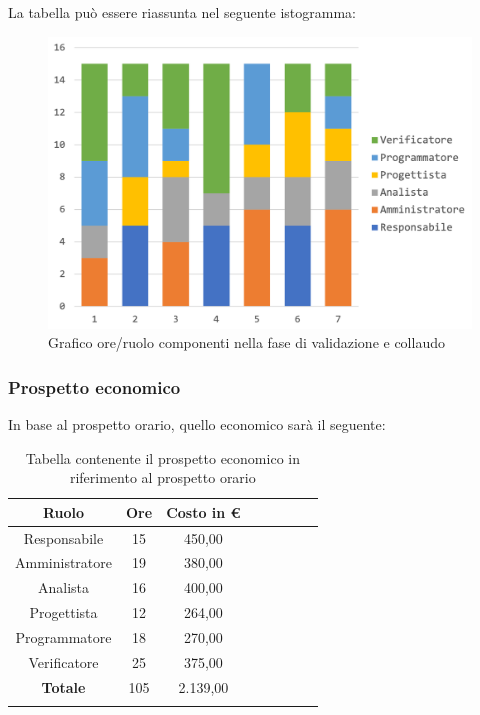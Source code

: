 		La tabella può essere riassunta nel seguente istogramma:
		\begin{figure}[H]
			\centering
			\includegraphics[width=0.8\linewidth]{./images/preventivo/validColl1.png}
			\caption{Grafico ore/ruolo componenti nella fase di validazione e collaudo}
			\label{fig:grafico suddivione ruoli fase di validazione e collaudo}
		\end{figure}
		
		\subsubsection{Prospetto economico}
		In base al prospetto orario, quello economico sarà il seguente: 
		
		\begin{longtable}{|c|c|c|c|c|c|c|c|}
			\hline
			\rowcolor{lighter-grayer}
			\textbf{Ruolo} & \textbf{Ore} & \textbf{Costo in € } \\
			\hline
			\endfirsthead
			
			\hline
			Responsabile 	    & 15 & 450,00\\
			\hline 
			\hline
			Amministratore	   & 19 & 380,00\\
			\hline
			\hline
			Analista 				& 16 & 400,00\\
			\hline
			\hline
			Progettista 		   & 12 & 264,00\\
			\hline
			\hline
			Programmatore 	  & 18 & 270,00\\
			\hline
			\hline
			Verificatore 		   & 25 & 375,00\\
			\hline
			\textbf{Totale} 	 & 105 & 2.139,00\\
			\hline
			\caption{Tabella contenente il prospetto economico in riferimento al prospetto orario}
		\end{longtable}
		\pagebreak
		
